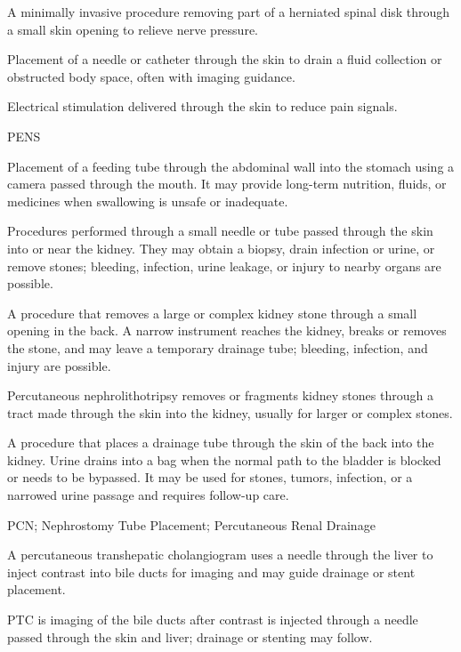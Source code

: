  A minimally invasive procedure removing part of a herniated spinal disk through a small skin opening to relieve nerve pressure.

 Placement of a needle or catheter through the skin to drain a fluid collection or obstructed body space, often with imaging
guidance.

 Electrical stimulation delivered through the skin to reduce pain signals.

\synonyms
PENS

 Placement of a feeding tube through the abdominal wall into the stomach using a camera passed through the mouth. It may provide long-term nutrition, fluids, or medicines when swallowing is unsafe or inadequate.

 Procedures performed through a small needle or tube passed through the skin into or near the kidney. They may obtain a biopsy, drain infection or urine, or remove stones; bleeding, infection, urine leakage, or injury to nearby organs are possible.

 A procedure that removes a large or complex kidney stone through a small opening in the back. A narrow instrument reaches the kidney, breaks or removes the stone, and may leave a temporary drainage tube; bleeding, infection, and injury are possible.

 Percutaneous nephrolithotripsy removes or fragments kidney stones through a tract made through the skin into the kidney, usually for larger or complex stones.

 A procedure that places a drainage tube through the skin of the back into the kidney. Urine drains into a bag when the normal path to the bladder is blocked or needs to be bypassed. It may be used for stones, tumors, infection, or a narrowed urine passage and requires follow-up care.

\synonyms
PCN; Nephrostomy Tube Placement; Percutaneous Renal Drainage

 A percutaneous transhepatic cholangiogram uses a needle through the liver to inject contrast into bile ducts for imaging and may guide drainage or stent placement.

 PTC is imaging of the bile ducts after contrast is injected through a needle passed through the skin and liver; drainage or stenting may follow.

